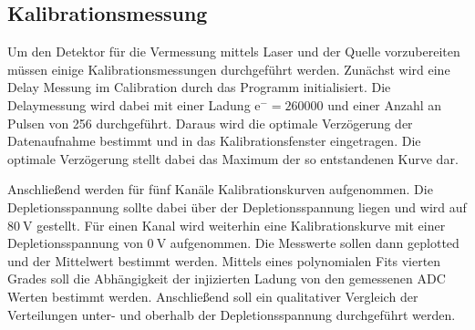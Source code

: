\subsection{Kalibrationsmessung}

Um den Detektor für die Vermessung mittels Laser und der Quelle vorzubereiten müssen einige Kalibrationsmessungen durchgeführt werden.
Zunächst wird eine Delay Messung im Calibration durch das Programm initialisiert.
Die Delaymessung wird dabei mit einer Ladung $\mathup{e}^- = 260000$ und einer Anzahl an Pulsen von 256 durchgeführt.
Daraus wird die optimale Verzögerung der Datenaufnahme bestimmt und in das Kalibrationsfenster eingetragen.
Die optimale Verzögerung stellt dabei das Maximum der so entstandenen Kurve dar.

Anschließend werden für fünf Kanäle Kalibrationskurven aufgenommen.
Die Depletionsspannung sollte dabei über der Depletionsspannung liegen und wird auf $\SI{80}{\volt}$ gestellt.
Für einen Kanal wird weiterhin eine Kalibrationskurve mit einer Depletionsspannung von $\SI{0}{\volt}$ aufgenommen.
Die Messwerte sollen dann geplotted und der Mittelwert bestimmt werden.
Mittels eines polynomialen Fits vierten Grades soll die Abhängigkeit der injizierten Ladung von den gemessenen ADC Werten bestimmt werden.
Anschließend soll ein qualitativer Vergleich der Verteilungen unter- und oberhalb der Depletionsspannung durchgeführt werden.
